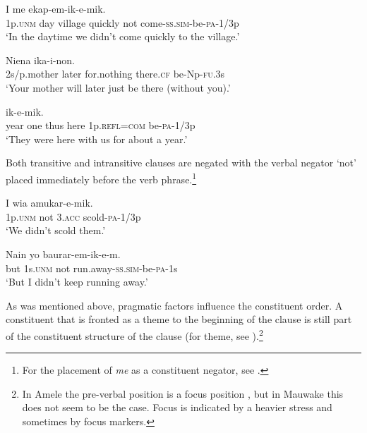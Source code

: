 \ea%
\label{ex:5:x915}
\gll I      me  ekap-em-ik-e-mik. \\
     1p.\textsc{unm}  day  village  quickly  not  come-\textsc{ss}.\textsc{sim}-be-\textsc{pa}-1/3p \\
\glt `In the daytime we didn't come quickly to the village.'
\z

\ea%
\label{ex:5:x918}
\gll Niena      ika-i-non. \\
     2s/p.mother  later  for.nothing  there.\textsc{cf}  be-Np-\textsc{fu}.3s \\
\glt `Your mother will later just be there (without you).'
\z

\ea%
\label{ex:5:x919}
\gll {}        ik-e-mik. \\
     year  one  thus  here  1p.\textsc{refl}=\textsc{com}  be-\textsc{pa}-1/3p \\
\glt `They were here with us for about a year.' 
\z

Both transitive and intransitive clauses are negated with the verbal negator  `not' placed immediately before the verb phrase.\footnote{For the placement of \textit{me} as a constituent negator, see .} 

\ea%
\label{ex:5:x981}
\gll I    wia  amukar-e-mik. \\
     1p.\textsc{unm}  not  3.\textsc{acc}  scold-\textsc{pa}-1/3p \\
\glt `We didn't scold them.'
\z

\ea%
\label{ex:5:x1057}
\gll Nain  yo    baurar-em-ik-e-m. \\
     but  1s.\textsc{unm}  not  run.away-\textsc{ss}.\textsc{sim}-be-\textsc{pa}-1s \\
\glt `But I didn't keep running away.'
\z

As was mentioned above, pragmatic factors influence the constituent order.  A constituent that is fronted as a theme to the beginning of the clause is still part of the constituent structure of the clause (for theme, see ).\footnote{In Amele the pre-verbal position is a focus position \citep[142]{Roberts1987}, but in Mauwake this does not seem to be the case. Focus is indicated by a heavier stress and sometimes by focus markers.} 


